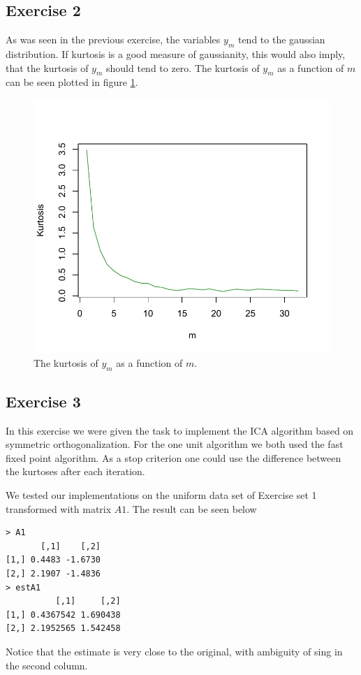 \documentclass{article}
\begin{document}
\subsection{Exercise 2}
As was seen in the previous exercise, the variables $y_m$ tend to the
gaussian distribution. If kurtosis is a good measure of gaussianity,
this would also imply, that the kurtosis of $y_m$ should tend to
zero. The kurtosis of $y_m$ as a function of $m$ can be seen plotted
in figure \ref{fig:kurtosisM}.

\begin{figure}\centering
	\includegraphics[trim = 0cm 0.5cm 0cm 1cm, clip = true, totalheight=0.5\textheight]{kurtosisM.pdf}
	\caption{The kurtosis of $y_m$ as a function of $m$.} \label{fig:kurtosisM}
\end{figure}

\subsection{Exercise 3}
In this exercise we were given the task to implement the ICA algorithm
based on symmetric orthogonalization. For the one unit algorithm we
both used the fast fixed point algorithm. As a stop criterion one could use
the difference between the kurtoses after each iteration.

We tested our implementations on the uniform data set of Exercise set
1 transformed with matrix $A1$. The result can be seen below
\begin{verbatim}
> A1
       [,1]    [,2]
[1,] 0.4483 -1.6730
[2,] 2.1907 -1.4836
> estA1
          [,1]     [,2]
[1,] 0.4367542 1.690438
[2,] 2.1952565 1.542458
\end{verbatim}
Notice that the estimate is very close to the original, with ambiguity
of sing in the second column.
\end{document}
